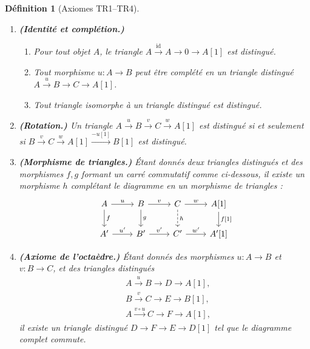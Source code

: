 \documentclass[a4paper,12pt]{book}
\newcommand{\id}{\mathrm{id}}
\newtheorem{definition}[theoreme]{Définition}
\begin{document}
\begin{definition}[Axiomes TR1--TR4]\label{def:TR-axioms}
\begin{enumerate}[label=\textbf{(TR\arabic*)}]
\item\label{TR1} \textbf{(Identité et complétion.)}
  \begin{enumerate}[label=(\alph*)]
  \item Pour tout objet $A$, le triangle
    $A \xrightarrow{\id} A \to 0 \to A[1]$ est distingué.
  \item Tout morphisme $u \colon A \to B$ peut être complété en un
    triangle distingué $A \xrightarrow{u} B \to C \to A[1]$.
  \item Tout triangle isomorphe à un triangle distingué est distingué.
  \end{enumerate}

\item\label{TR2} \textbf{(Rotation.)}
  Un triangle $A \xrightarrow{u} B \xrightarrow{v} C \xrightarrow{w} A[1]$
  est distingué si et seulement si
  $B \xrightarrow{v} C \xrightarrow{w} A[1] \xrightarrow{-u[1]} B[1]$
  est distingué.

\item\label{TR3} \textbf{(Morphisme de triangles.)}
  Étant donnés deux triangles distingués et des morphismes $f, g$
  formant un carré commutatif comme ci-dessous, il existe un morphisme $h$
  complétant le diagramme en un morphisme de triangles :
\[
\begin{tikzcd}
A \arrow[r, "u"] \arrow[d, "f"] & B \arrow[r, "v"] \arrow[d, "g"]
  & C \arrow[r, "w"] \arrow[d, dashed, "h"] & A{[1]} \arrow[d, "f{[1]}"] \\
A' \arrow[r, "u'"] & B' \arrow[r, "v'"] & C' \arrow[r, "w'"] & A'{[1]}
\end{tikzcd}
\]

\item\label{TR4} \textbf{(Axiome de l'octaèdre.)}
  Étant donnés des morphismes $u \colon A \to B$ et $v \colon B \to C$,
  et des triangles distingués
  \begin{align*}
    & A \xrightarrow{u} B \to D \to A[1], \\
    & B \xrightarrow{v} C \to E \to B[1], \\
    & A \xrightarrow{v \circ u} C \to F \to A[1],
  \end{align*}
  il existe un triangle distingué $D \to F \to E \to D[1]$ tel que
  le diagramme complet commute.
\end{enumerate}
\end{definition}
\end{document}
